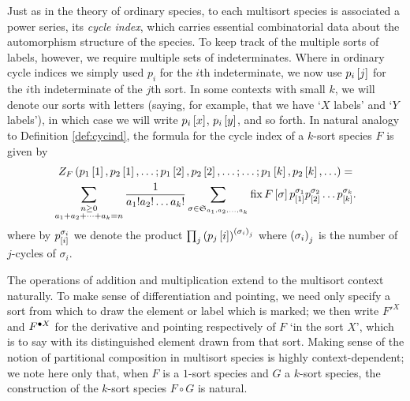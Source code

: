 \documentclass[sectionflow,singlespace,twoside]{brandiss} %
\numberwithin{section}{chapter}
\numberwithin{figure}{chapter}
\begin{document}
Just as in the theory of ordinary species, to each multisort species is associated a power series, its \emph{cycle index}, which carries essential combinatorial data about the automorphism structure of the species.
To keep track of the multiple sorts of labels, however, we require multiple sets of indeterminates.
Where in ordinary cycle indices we simply used $p_{i}$ for the $i$th indeterminate, we now use $p_{i} \sbrac{j}$ for the $i$th indeterminate of the $j$th sort.
In some contexts with small $k$, we will denote our sorts with letters (saying, for example, that we have `$X$ labels' and `$Y$ labels'), in which case we will write $p_{i} \sbrac{x}$, $p_{i} \sbrac{y}$, and so forth.
In natural analogy to Definition \ref{def:cycind}, the formula for the cycle index of a $k$-sort species $F$ is given by
\begin{multline}
  \label{eq:multcycinddef}
  Z_{F} \pbrac{p_{1} \sbrac{1}, p_{2} \sbrac{1}, \dots; p_{1} \sbrac{2}, p_{2} \sbrac{2}, \dots; \dots; p_{1} \sbrac{k}, p_{2} \sbrac{k}, \dots} = \\
  \sum_{\substack{n \geq 0 \\ a_{1} + a_{2} + \dots + a_{k} = n}} \frac{1}{a_{1}! a_{2}! \dots a_{k}!} \sum_{\sigma \in \mathfrak{S}_{a_{1}, a_{2}, \dots, a_{k}}} \fix F \sbrac{\sigma} p^{\sigma_{1}}_{\sbrac{1}} p^{\sigma_{2}}_{\sbrac{2}} \dots p^{\sigma_{k}}_{\sbrac{k}}.
\end{multline}
where by $p^{\sigma_{i}}_{\sbrac{i}}$ we denote the product $\prod_{j} \pbrac{p_{j} \sbrac{i}}^{\pbrac{\sigma_{i}}_{j}}$ where $\pbrac{\sigma_{i}}_{j}$ is the number of $j$-cycles of $\sigma_{i}$.

The operations of addition and multiplication extend to the multisort context naturally.
To make sense of differentiation and pointing, we need only specify a sort from which to draw the element or label which is marked; we then write $F'^{X}$ and $\pointed[X]{F}$ for the derivative and pointing respectively of $F$ `in the sort $X$', which is to say with its distinguished element drawn from that sort.
Making sense of the notion of partitional composition in multisort species is highly context-dependent; we note here only that, when $F$ is a $1$-sort species and $G$ a $k$-sort species, the construction of the $k$-sort species $F \circ G$ is natural. 
\end{document}
